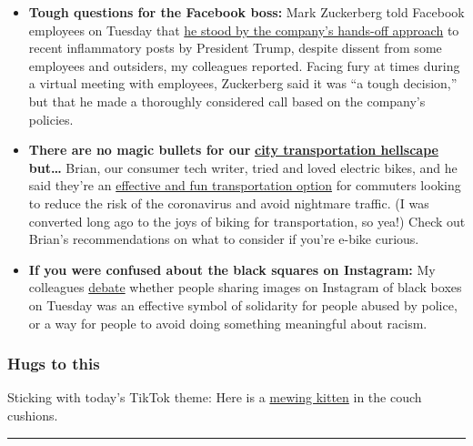 \begin{itemize}
\item
  \textbf{Tough questions for the Facebook boss:} Mark Zuckerberg told
  Facebook employees on Tuesday that
  \href{https://www.nytimes3xbfgragh.onion/2020/06/02/technology/zuckerberg-defends-facebook-trump-posts.html}{he
  stood by the company's hands-off approach} to recent inflammatory
  posts by President Trump, despite dissent from some employees and
  outsiders, my colleagues reported. Facing fury at times during a
  virtual meeting with employees, Zuckerberg said it was ``a tough
  decision,'' but that he made a thoroughly considered call based on the
  company's policies.
\item
  \textbf{There are no magic bullets for our}
  \textbf{\href{https://www.nytimes3xbfgragh.onion/2020/05/27/technology/public-transportation-cities-pandemic.html}{city
  transportation hellscape}} \textbf{but\ldots{}} Brian, our consumer
  tech writer, tried and loved electric bikes, and he said they're an
  \href{https://www.nytimes3xbfgragh.onion/2020/06/03/technology/personaltech/e-bikes-are-having-their-moment-they-deserve-it.html}{effective
  and fun transportation option} for commuters looking to reduce the
  risk of the coronavirus and avoid nightmare traffic. (I was converted
  long ago to the joys of biking for transportation, so yea!) Check out
  Brian's recommendations on what to consider if you're e-bike curious.
\item
  \textbf{If you were confused about the black squares on Instagram:} My
  colleagues
  \href{https://www.nytimes3xbfgragh.onion/2020/06/02/style/instagram-blackout.html}{debate}
  whether people sharing images on Instagram of black boxes on Tuesday
  was an effective symbol of solidarity for people abused by police, or
  a way for people to avoid doing something meaningful about racism.
\end{itemize}

\hypertarget{hugs-to-this}{%
\subsubsection{Hugs to this}\label{hugs-to-this}}

Sticking with today's TikTok theme: Here is a
\href{https://www.tiktok.com/@miaamabile/video/6807566845948873990}{mewing
kitten} in the couch cushions.

\begin{center}\rule{0.5\linewidth}{\linethickness}\end{center}

